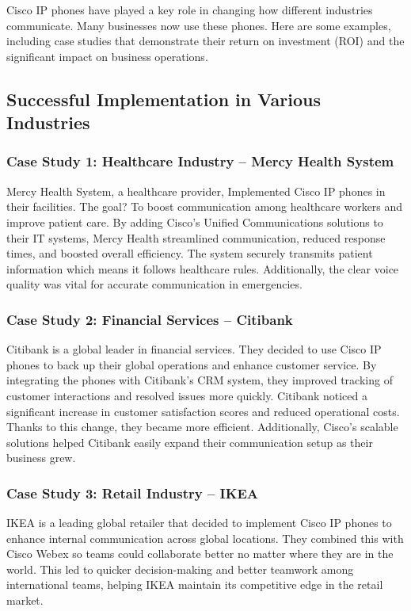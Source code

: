 \documentclass[11pt,a4paper]{article}
\begin{document}
Cisco IP phones have played a key role in changing how different industries communicate. Many businesses now use these phones. Here are some examples, including case studies that demonstrate their return on investment (ROI) and the significant impact on business operations.


\subsection*{Successful Implementation in Various Industries}

\subsubsection*{Case Study 1: Healthcare Industry – Mercy Health System}

Mercy Health System, a healthcare provider, Implemented Cisco IP phones in their facilities. The goal? To boost communication among healthcare workers and improve patient care. By adding Cisco’s Unified Communications solutions to their IT systems, Mercy Health streamlined communication, reduced response times, and boosted overall efficiency. The system securely transmits patient information which means it follows healthcare rules. Additionally, the clear voice quality was vital for accurate communication in emergencies.


\subsubsection*{Case Study 2: Financial Services – Citibank}

Citibank is a global leader in financial services. They decided to use Cisco IP phones to back up their global operations and enhance customer service. By integrating the phones with Citibank’s CRM system, they improved tracking of customer interactions and resolved issues more quickly. Citibank noticed a significant increase in customer satisfaction scores and reduced operational costs. Thanks to this change, they became more efficient. Additionally, Cisco’s scalable solutions helped Citibank easily expand their communication setup as their business grew.

\subsubsection*{Case Study 3: Retail Industry – IKEA}

IKEA is a leading global retailer that decided to implement Cisco IP phones to enhance internal communication across global locations. They combined this with Cisco Webex so teams could collaborate better no matter where they are in the world. This led to quicker decision-making and better teamwork among international teams, helping IKEA maintain its competitive edge in the retail market.
\end{document}
